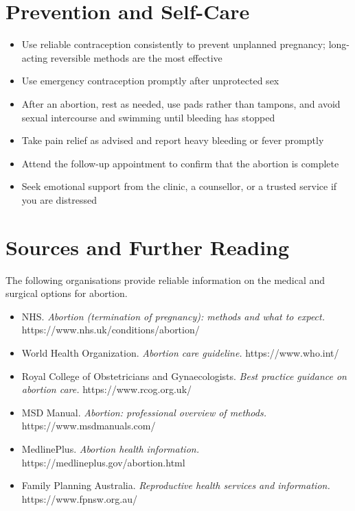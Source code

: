 \section*{Prevention and Self-Care}
\begin{itemize}
    \item Use reliable contraception consistently to prevent unplanned pregnancy; long-acting reversible methods are the most effective
    \item Use emergency contraception promptly after unprotected sex
    \item After an abortion, rest as needed, use pads rather than tampons, and avoid sexual intercourse and swimming until bleeding has stopped
    \item Take pain relief as advised and report heavy bleeding or fever promptly
    \item Attend the follow-up appointment to confirm that the abortion is complete
    \item Seek emotional support from the clinic, a counsellor, or a trusted service if you are distressed
\end{itemize}

\section*{Sources and Further Reading}
The following organisations provide reliable information on the medical and surgical options for abortion.

\begin{itemize}
    \item NHS. \textit{Abortion (termination of pregnancy): methods and what to expect.} https://www.nhs.uk/conditions/abortion/
    \item World Health Organization. \textit{Abortion care guideline.} https://www.who.int/
    \item Royal College of Obstetricians and Gynaecologists. \textit{Best practice guidance on abortion care.} https://www.rcog.org.uk/
    \item MSD Manual. \textit{Abortion: professional overview of methods.} https://www.msdmanuals.com/
    \item MedlinePlus. \textit{Abortion health information.} https://medlineplus.gov/abortion.html
    \item Family Planning Australia. \textit{Reproductive health services and information.} https://www.fpnsw.org.au/
\end{itemize}
